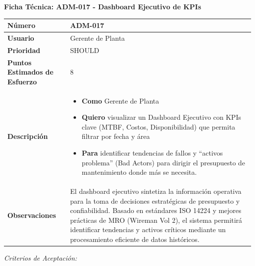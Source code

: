 \noindent\textbf{Ficha Técnica: ADM-017 - Dashboard Ejecutivo de KPIs}
\footnotesize\setlength{\tabcolsep}{4pt}\renewcommand{\arraystretch}{1.2}
\begin{longtable}{|p{0.21\textwidth}|p{0.74\textwidth}|}\hline
\textbf{Número} & ADM-017 \\ \hline
\textbf{Usuario} & Gerente de Planta \\ \hline
\textbf{Prioridad} & SHOULD \\ \hline
\textbf{Puntos Estimados de Esfuerzo} & 8 \\ \hline
\textbf{Descripción} & \parbox[t]{\linewidth}{\vspace{2pt}\begin{itemize}[leftmargin=1.5em, nosep, topsep=0pt]
\item \textbf{Como} Gerente de Planta
\item \textbf{Quiero} visualizar un Dashboard Ejecutivo con KPIs clave (MTBF, Costos, Disponibilidad) que permita filtrar por fecha y área
\item \textbf{Para} identificar tendencias de fallos y ``activos problema'' (Bad Actors) para dirigir el presupuesto de mantenimiento donde más se necesita.
\end{itemize}\vspace{2pt}} \\ \hline
\textbf{Observaciones} & El dashboard ejecutivo sintetiza la información operativa para la toma de decisiones estratégicas de presupuesto y confiabilidad. Basado en estándares ISO 14224 y mejores prácticas de MRO (Wireman Vol 2), el sistema permitirá identificar tendencias y activos críticos mediante un procesamiento eficiente de datos históricos. \\ \hline
\end{longtable}\normalsize
\noindent\textit{Criterios de Aceptación:}
